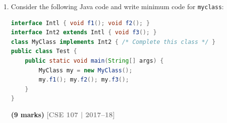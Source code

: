 \documentclass[12pt,a3paper]{article}
\newcommand{\yr}[1]{\hfill\textcolor{gray}{\small\textbf{[#1]}}}
\newcommand{\mk}[1]{\textcolor{orange!70!black}{\small\textbf{(#1 marks)}}}
\begin{document}
\begin{enumerate}
\begin{tcolorbox}[enhanced,breakable,ansbox,
  colback=cD!4,colframe=cD,boxrule=0.8pt,arc=5pt,
  title={\textbf{Answer --- Abstract Class Restrictions \& Fix}},
  fonttitle=\bfseries\color{white},colbacktitle=cD]
\textbf{Restrictions on an abstract class:}
\begin{enumerate}[label=\textbf{\arabic*.}]
  \item Cannot be instantiated directly (\texttt{new AbstractClass()} is illegal).
  \item If a class has even one abstract method, the class must be declared \texttt{abstract}.
  \item A subclass must implement all abstract methods, or itself be declared \texttt{abstract}.
  \item Cannot use both \texttt{abstract} and \texttt{final} on the same class or method.
  \item Abstract methods cannot be \texttt{private}, \texttt{static}, or \texttt{final}.
\end{enumerate}

\medskip
\textbf{Problems in the given code:}

\begin{enumerate}[label=\textbf{\arabic*.}]
  \item \texttt{final class X} cannot be extended --- \texttt{class Y extends X} is a compile error.
  \item \texttt{final void show()} in \texttt{X} cannot be overridden --- \texttt{Y.show()} is a compile error.
\end{enumerate}

\textbf{Fix:} Remove \texttt{final} from the class and the method.

\begin{lstlisting}[language=Java]
class X {                                       // removed final
    void show() {                               // removed final
        System.out.println("Printed from a method");
    }
}
class Y extends X {
    void show() { System.out.println("In subclass method"); }
}
\end{lstlisting}

\end{tcolorbox}

\item Consider the following Java code and write minimum code for \texttt{myclass}:
\begin{lstlisting}[language=Java]
interface Intl { void f1(); void f2(); }
interface Int2 extends Intl { void f3(); }
class MyClass implements Int2 { /* Complete this class */ }
public class Test {
    public static void main(String[] args) {
        MyClass my = new MyClass();
        my.f1(); my.f2(); my.f3();
    }
}
\end{lstlisting}
\mk{9}
\yr{CSE 107 | 2017--18}


\end{enumerate}
\end{document}
